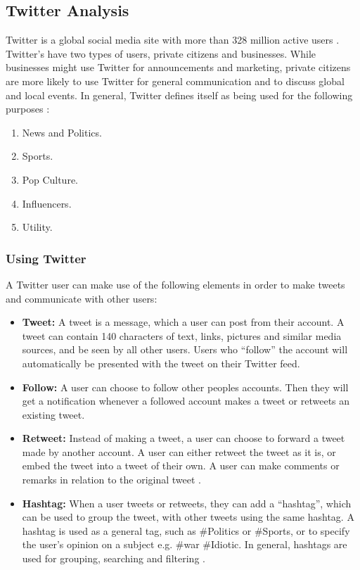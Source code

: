 \subsection{Twitter Analysis}\label{sec:twitter-analysis}
Twitter is a global social media site with more than 328 million active users
\citep{SocialMediaStats}. Twitter's have two types of users, private citizens
and businesses. While businesses might use Twitter for announcements and
marketing, private citizens are more likely to use Twitter for general
communication and to discuss global and local events. In general, Twitter
defines itself as being used for the following purposes \citep{StartingTwitter}:

\begin{enumerate}    
  \item News and Politics.
  \item Sports.
  \item Pop Culture. 
  \item Influencers.
  \item Utility.
\end{enumerate} %

\subsubsection{Using Twitter}
A Twitter user can make use of the following elements \citep{StartingTwitter}
in order to make tweets and communicate with other users:

\begin{itemize}
  \item \textbf{Tweet:} A tweet is a message, which a user can post from their
  account. A tweet can contain 140 characters \citep{StartingTwitter2}
   of text, links, pictures and
  similar media sources, and be seen by all other users. Users who ``follow''
  the account will automatically be presented with the tweet on their Twitter
  feed.
  \item \textbf{Follow:} A user can choose to follow other peoples accounts.
  Then they will get a notification whenever a followed account makes a tweet
  or retweets an existing tweet.
  \item \textbf{Retweet:} Instead of making a tweet, a user can choose to
  forward a tweet made by another account. A user can either retweet the tweet
  as it is, or embed the tweet into a tweet of their own. A user can make
  comments or remarks in relation to the original tweet .
  \item \textbf{Hashtag:} When a user tweets or retweets, they can add a
  ``hashtag'', which can be used to group the tweet, with other tweets using
  the same hashtag. A hashtag is used as a general tag, such as \#Politics or
  \#Sports, or to specify the user's opinion on a subject e.g. \#war \#Idiotic.
  In general, hashtags are used for grouping, searching and filtering 
  .
\end{itemize}

